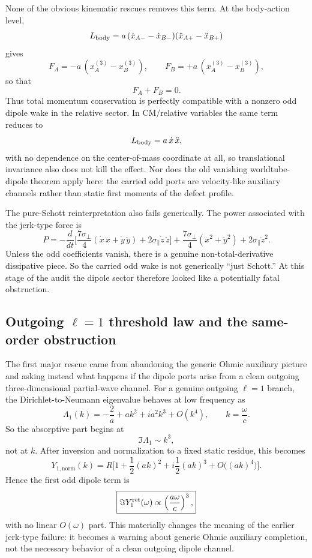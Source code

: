 \documentclass[11pt]{article}
\begin{document}
None of the obvious kinematic rescues removes this term.  At the body-action
level,
\[
L_{\rm body}=a\,(\dot x_{A-}-\dot x_{B-})(\ddot x_{A+}-\ddot x_{B+})
\]
gives
\[
F_A=-a\,(x_A^{(3)}-x_B^{(3)}),
\qquad
F_B=+a\,(x_A^{(3)}-x_B^{(3)}),
\]
so that
\[
F_A+F_B=0.
\]
Thus total momentum conservation is perfectly compatible with a nonzero odd
dipole wake in the relative sector.  In CM/relative variables the same term
reduces to
\[
L_{\rm body}=a\,\dot x\,\ddot x,
\]
with no dependence on the center-of-mass coordinate at all, so translational
invariance also does not kill the effect.  Nor does the old vanishing
worldtube-dipole theorem apply here: the carried odd ports are velocity-like
auxiliary channels rather than static first moments of the defect profile.

The pure-Schott reinterpretation also fails generically.  The power associated
with the jerk-type force is
\[
P=
-\frac{d}{dt}\Bigg[
\frac{7\sigma_\perp}{4}(\dot x\,\ddot x+\dot y\,\ddot y)
+2\sigma_\parallel\dot z\,\ddot z
\Bigg]
+
\frac{7\sigma_\perp}{4}(\ddot x^2+\ddot y^2)
+2\sigma_\parallel\ddot z^2.
\]
Unless the odd coefficients vanish, there is a genuine non-total-derivative
dissipative piece.  So the carried odd wake is not generically ``just Schott.'' 
At this stage of the audit the dipole sector therefore looked like a potentially
fatal obstruction.

\subsection{Outgoing \texorpdfstring{$\ell=1$}{ell=1} threshold law and the same-order obstruction}
\label{sec:dipole-audit-outgoing}

The first major rescue came from abandoning the generic Ohmic auxiliary picture
and asking instead what happens if the dipole ports arise from a clean outgoing
three-dimensional partial-wave channel.  For a genuine outgoing $\ell=1$ branch,
the Dirichlet-to-Neumann eigenvalue behaves at low frequency as
\[
\Lambda_1(k)=-\frac{2}{a}+ak^2+i a^2k^3+O(k^4),
\qquad
k=\frac{\omega}{c}.
\]
So the absorptive part begins at
\[
\Im\Lambda_1\sim k^3,
\]
not at $k$.  After inversion and normalization to a fixed static residue, this
becomes
\[
Y_{1,\mathrm{norm}}(k)
=
R\Bigg[1+\frac12(ak)^2+i\frac12(ak)^3+O\bigl((ak)^4\bigr)\Bigg].
\]
Hence the first odd dipole term is
\[
\boxed{
\Im Y_1^{\rm ret}(\omega)
\propto
\left(\frac{a\omega}{c}\right)^3,
}
\]
with no linear $O(\omega)$ part.  This materially changes the meaning of the
earlier jerk-type failure: it becomes a warning about generic Ohmic auxiliary
completion, not the necessary behavior of a clean outgoing dipole channel.
\end{document}
